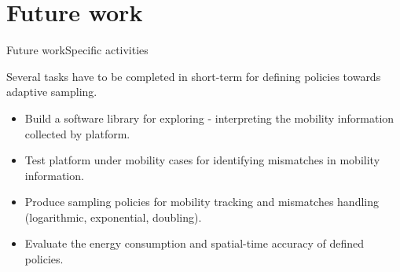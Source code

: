 \documentclass[8pt,xcolor={dvipsnames},handout]{beamer}
\begin{document}

\section{Future work}
\begin{frame}{Future work}{Specific activities}
{
Several tasks have to be completed in short-term for defining policies towards adaptive sampling.
\begin{itemize}
  \item Build a software library for exploring - interpreting the mobility information collected by platform.
  \item Test platform under mobility cases for identifying mismatches in mobility information.
  \item Produce sampling policies for mobility tracking and mismatches handling (logarithmic, exponential, doubling).
  \item Evaluate the energy consumption and spatial-time accuracy of defined policies.
\end{itemize}
}
\end{frame}
\end{document}
